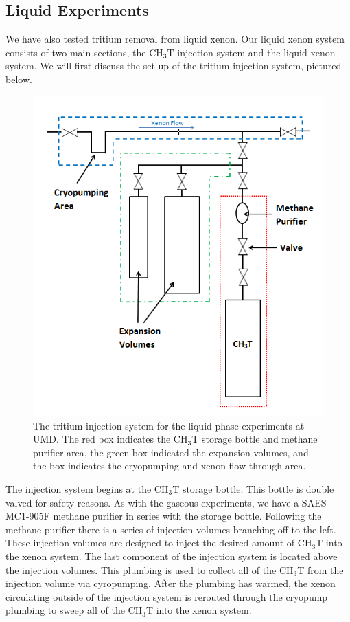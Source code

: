 \subsection{Liquid Experiments}

We have also tested tritium removal from liquid xenon.  Our liquid xenon system consists of two main sections, the CH$_3$T injection system and the liquid xenon system.  We will first discuss the set up of the tritium injection system, pictured below.

\begin{figure}[h]
\centering
\includegraphics[scale=0.4]{UMDInjectionSys.png}
\caption{The tritium injection system for the liquid phase experiments at UMD. The red box indicates the CH$_3$T storage bottle and methane purifier area, the green box indicated the expansion volumes, and the box indicates the cryopumping and xenon flow through area.}
\label{fig:UMDSys}
\end{figure}

The injection system begins at the CH$_3$T storage bottle.  This bottle is double valved for safety reasons.  As with the gaseous experiments, we have a SAES MC1-905F methane purifier in series with the storage bottle.  Following the methane purifier there is a series of injection volumes branching off to the left.  These injection volumes are designed to inject the desired amount of CH$_3$T into the xenon system.  The last component of the injection system is located above the injection volumes.  This plumbing is used to collect all of the CH$_3$T from the injection volume via cyropumping.  After the plumbing has warmed, the xenon circulating outside of the injection system is rerouted through the cryopump plumbing to sweep all of the CH$_3$T into the xenon system.

